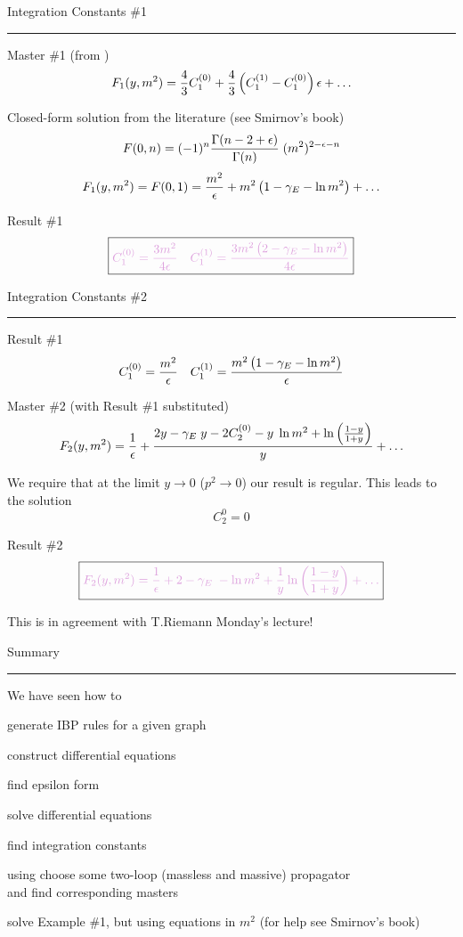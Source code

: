 \documentclass[11pt]{article}
\newcommand{\titleb}[2]{{\color{Blue}{\LARGE #1}\hfill{\Large #2}\vspace{-2mm}\par\rule{\textwidth}{1pt}\vs}}
\newcommand{\bbox}[1]{\color{black}\boxed{{\color{Plum}#1}}}
\begin{document}
\titleb{Example 1}{Integration Constants \#1}
    Master \#1 (from \fuchsia)
    $$ F_1(y,m^2) = \frac{4}{3}C_1^{(0)} +  \frac{4}{3}\left(C_1^{(1)}-C_1^{(0)}\right)\epsilon + \ldots $$

    Closed-form solution from the literature (see Smirnov's book)
    $$ F(0,n) = (-1)^n \frac{\Gamma(n-2+\epsilon)}{\Gamma(n)} \; (m^2)^{2-\epsilon-n} $$
    $$
      F_1(y,m^2)
       = F(0,1) 
       = \frac{m^2}{\epsilon} + m^2 \left(1- \gamma_E - \ln{m^2} \right) + \ldots
    $$

Result \#1
    $$ \bbox{C_1^{(0)} = \frac{3m^2}{4\eps} \quad C_1^{(1)} = \frac{3m^2 \left(2- \gamma_E - \ln{m^2} \right)}{4\eps}}$$
\newpage


\titleb{Example 1}{Integration Constants \#2}
  Result \#1
    $$ C_1^{(0)} = \frac{m^2}{\epsilon} \quad C_1^{(1)} = \frac{m^2 \left(1- \gamma_E - \ln{m^2} \right)}{\epsilon}$$

  Master \#2 (with Result \#1 substituted)
    $$
      F_2(y,m^2)
      =
      \frac{1}{\epsilon}
      +
      \frac{2y - \gamma_E\; y - 2 C_2^{(0)} - y\; \ln{m^2} + \ln\left(\frac{1-y}{1+y}\right)}{y}
      +
      \ldots
    $$

  We require that at the limit $y\to 0$ ($p^2\to 0$) our result is regular. This leads to the solution
$$ C_2^{0} = 0 $$

Result \#2
$$\bbox{
  F_2(y,m^2)
  =
  \frac{1}{\eps}
  +
 2 - \gamma_E\x - \ln{m^2} + \frac{1}{y}\ln\left(\frac{1-y}{1+y}\right)
  +
  \ldots}
$$

This is in agreement with T.Riemann Monday's lecture!
\newpage


\titleb{Example 1}{Summary}
We have seen how to
\bi
  \item generate IBP rules for a given graph
  \item construct differential equations
  \item find epsilon form
  \item solve differential equations
  \item find integration constants
\ei

\bi
  \item using \litered choose some two-loop (massless and massive) propagator \\ and find corresponding masters
  \item solve Example \#1, but using equations in $m^2$ (for help see Smirnov's book)
\ei

\newpage
\end{document}
